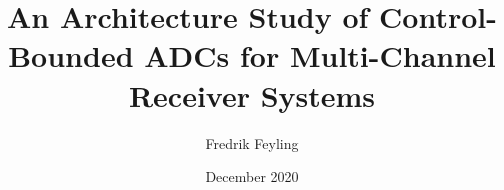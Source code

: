 \title{An Architecture Study of Control-Bounded ADCs for Multi-Channel Receiver Systems}
\author{Fredrik Feyling}
\date{December 2020}
\maketitle
